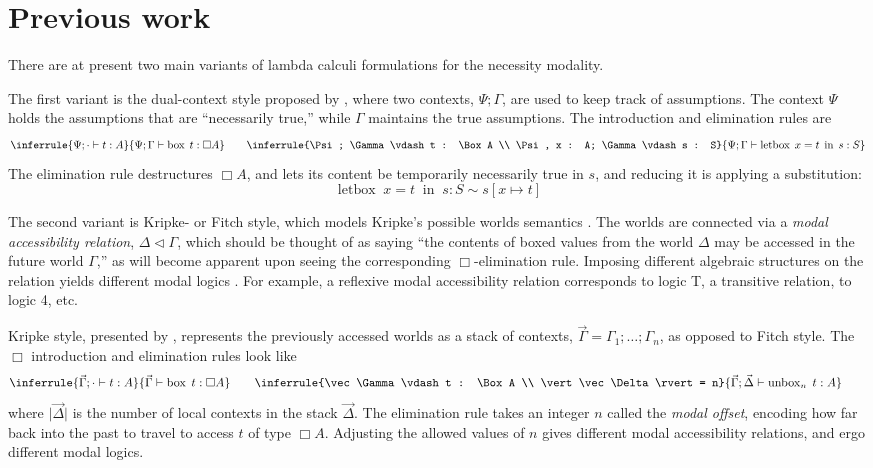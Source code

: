 \documentclass[12pt,twoside,openright]{report}
\numberwithin{equation}{chapter}
\numberwithin{figure}{chapter}
\numberwithin{table}{chapter}
\theoremstyle{definition}\newtheorem{definition}{Definition}
\begin{document}
\section{Previous work}

There are at present two main variants of lambda calculi formulations
for the necessity modality.

The first variant is the dual-context style proposed by \textcite{pfenning95,davies01},
where two contexts, $\Psi; \Gamma$, are used to keep track of assumptions.
The context $\Psi$ holds the assumptions that are ``necessarily true,''
while $\Gamma$ maintains the true assumptions.
The introduction and elimination rules are
\begin{equation*}
  \inferrule{\Psi; \cdot \vdash t : A}{\Psi; \Gamma \vdash \operatorname{box} \; t : \Box A} \qquad
  \inferrule{\Psi; \Gamma \vdash t : \Box A \\ \Psi, x : A; \Gamma \vdash s : S}{\Psi; \Gamma \vdash \operatorname{letbox} \; x = t \; \operatorname{in} \; s : S}
\end{equation*}
The elimination rule destructures $\Box A$,
and lets its content be temporarily necessarily true in $s$,
and reducing it is applying a substitution:
$$ \operatorname{letbox} \; x = t \; \operatorname{in} \; s : S \sim s[x \mapsto t] $$

The second variant is Kripke- or Fitch style,
which models Kripke's possible worlds semantics \cite{kripke63}.
The worlds are connected via a \emph{modal accessibility relation}, $\Delta\lhd\Gamma$,
which should be thought of as saying
``the contents of boxed values from the world $\Delta$
may be accessed in the future world $\Gamma$,''
as will become apparent upon seeing the corresponding $\Box$-elimination rule.
Imposing different algebraic structures on the relation
yields different modal logics \cite{huth04}.
For example, a reflexive modal accessibility relation corresponds to logic T,
a transitive relation, to logic 4, etc.

Kripke style, presented by \textcite{pfenning95,davies01},
represents the previously accessed worlds as a stack of contexts,
$\vec\Gamma = \Gamma_1; \ldots; \Gamma_n$,
as opposed to Fitch style.
The $\Box$ introduction and elimination rules look like
\begin{equation*}
  \inferrule{\vec\Gamma; \cdot \vdash t : A}{\vec\Gamma \vdash \operatorname{box} \; t : \Box A} \qquad
  \inferrule{\vec\Gamma \vdash t : \Box A \\ \vert\vec\Delta\rvert = n}{\vec\Gamma; \vec\Delta \vdash \operatorname{unbox}_n \; t : A} \qquad
\end{equation*}
where $\lvert\vec\Delta\rvert$ is the number of local contexts in the stack $\vec\Delta$.
The elimination rule takes an integer $n$ called the \emph{modal offset},
encoding how far back into the past to travel to access $t$ of type $\Box A$.
Adjusting the allowed values of $n$ gives different modal accessibility relations,
and ergo different modal logics.
\end{document}
